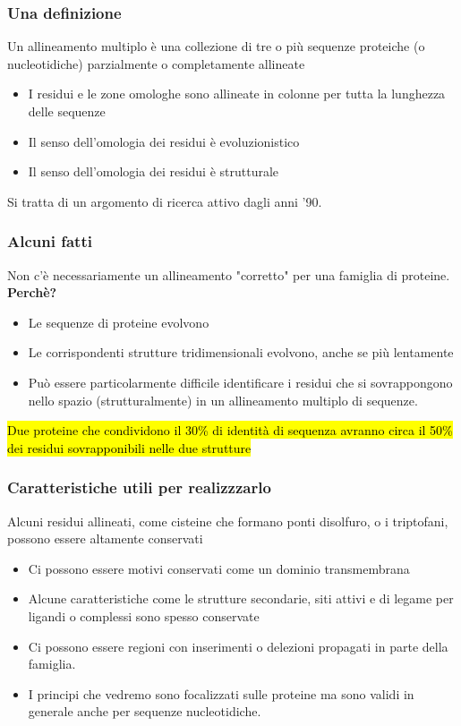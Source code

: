 \documentclass{article}
\begin{document}
\subsubsection{Una definizione}
Un allineamento multiplo è una collezione di tre o più sequenze proteiche (o nucleotidiche) parzialmente o completamente allineate
\begin{itemize}
    \item I residui e le zone omologhe sono allineate in colonne per tutta la lunghezza delle sequenze
    \item Il senso dell'omologia dei residui è evoluzionistico
    \item Il senso dell'omologia dei residui è strutturale
\end{itemize}
Si tratta di un argomento di ricerca attivo dagli anni '90.
\subsubsection{Alcuni fatti}
Non c'è necessariamente un allineamento "corretto" per una famiglia di proteine.\\
\textbf{Perchè?}
    \begin{itemize}
        \item Le sequenze di proteine evolvono
        \item Le corrispondenti strutture tridimensionali evolvono, anche se più lentamente
        \item Può essere particolarmente difficile identificare i residui che si sovrappongono nello spazio (strutturalmente) in un allineamento multiplo di sequenze.
    \end{itemize}
\hl{Due proteine che condividono il 30\% di identità di sequenza avranno circa il 50\% dei residui sovrapponibili nelle due strutture}
\subsubsection{Caratteristiche utili per realizzzarlo}
Alcuni residui allineati, come cisteine che formano ponti disolfuro, o i triptofani, possono essere altamente conservati
    \begin{itemize}
        \item Ci possono essere motivi conservati come un dominio transmembrana
        \item Alcune caratteristiche come le strutture secondarie, siti attivi e di legame per ligandi o complessi sono spesso conservate
        \item Ci possono essere regioni con inserimenti o delezioni propagati in parte della famiglia.
        \item I principi che vedremo sono focalizzati sulle proteine ma sono validi in generale anche per sequenze nucleotidiche.
    \end{itemize}
\end{document}
